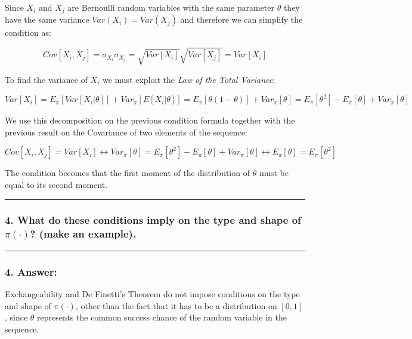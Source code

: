 \documentclass[
]{article}
\begin{document}
Since \(X_i\) and \(X_j\) are Bernoulli random variables with the same
parameter \(\theta\) they have the same variance \(Var(X_i) = Var(X_j)\)
and therefore we can simplify the condition as:

\[
Cov[X_i, X_j] = \sigma_{X_i}\sigma_{X_j} = 
\sqrt{Var[X_i]} \sqrt{Var[X_j]} =
Var[X_i]
\]

To find the variance of \(X_i\) we must exploit the \emph{Law of the
Total Variance}:

\[
Var[X_i] = E_\pi[Var[X_i|\theta]] + Var_\pi[E[X_i | \theta]] =
E_\pi[\theta(1-\theta)]+Var_\pi[\theta] = 
E_\pi[\theta^2] - E_\pi[\theta] + Var_\pi[\theta]
\]

We use this decomposition on the previous condition formula together
with the previous result on the Covariance of two elements of the
sequence:

\[
Cov[X_i, X_j] = Var[X_i] \leftrightarrow
Var_\pi[\theta] = E_\pi[\theta^2] - E_\pi[\theta] + Var_\pi[\theta] \leftrightarrow
E_\pi[\theta] = E_\pi[\theta^2]
\]

The condition becomes that the first moment of the distribution of
\(\theta\) must be equal to its second moment.

\begin{center}\rule{0.5\linewidth}{0.5pt}\end{center}

\hypertarget{what-do-these-conditions-imply-on-the-type-and-shape-of-picdot-make-an-example.}{%
\subsubsection{\texorpdfstring{4. What do these conditions imply on the
type and shape of \(\pi(\cdot)\)? (make an
example).}{4. What do these conditions imply on the type and shape of \textbackslash pi(\textbackslash cdot)? (make an example).}}\label{what-do-these-conditions-imply-on-the-type-and-shape-of-picdot-make-an-example.}}

\begin{center}\rule{0.5\linewidth}{0.5pt}\end{center}

\hypertarget{answer-13}{%
\subsubsection{4. Answer:}\label{answer-13}}

Exchangeability and De Finetti's Theorem do not impose conditions on the
type and shape of \(\pi(\cdot)\), other than the fact that it has to be
a distribution on \([0, 1]\), since \(\theta\) represents the common
success chance of the random variable in the sequence.
\end{document}
